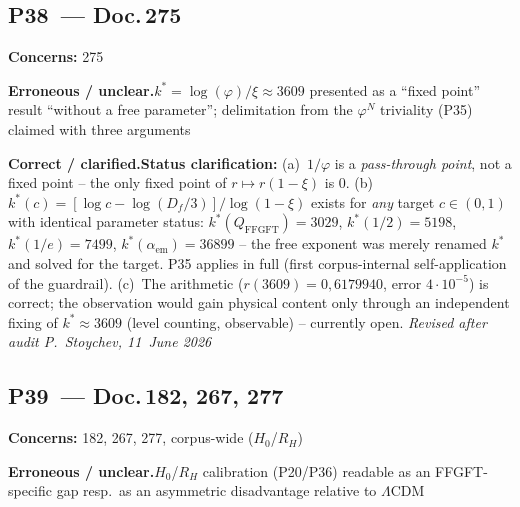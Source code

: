 \medskip


\subsection*{P38~--- Doc.\,275}

\noindent\textbf{Concerns:} 275


\smallskip\noindent\textbf{Erroneous / unclear.}\quad $k^* = \log(\varphi)/\xi \approx 3609$ presented as a \enquote{fixed point} result
  \enquote{without a free parameter}; delimitation from the
  $\varphi^N$ triviality (P35) claimed with three arguments


\smallskip\noindent\textbf{Correct / clarified.}\quad \textbf{Status clarification:} (a)~$1/\varphi$ is a \emph{pass-through point},
  not a fixed point -- the only fixed point of $r\mapsto r(1-\xi)$ is $0$.
  (b)~$k^*(c) = [\log c - \log(D_f/3)]/\log(1-\xi)$ exists for
  \emph{any} target $c\in(0,1)$ with identical parameter status:
  $k^*(Q_\mathrm{FFGFT})=3029$, $k^*(1/2)=5198$, $k^*(1/e)=7499$,
  $k^*(\alpha_\mathrm{em})=36899$ -- the free exponent was merely renamed
  $k^*$ and solved for the target. P35 applies in full
  (first corpus-internal self-application of the guardrail).
  (c)~The arithmetic ($r(3609)=0{,}6179940$, error $4{\cdot}10^{-5}$)
  is correct; the observation would gain physical content only through
  an independent fixing of $k^*\approx3609$ (level counting,
  observable) -- currently open.
  \emph{Revised after audit P.~Stoychev, 11~June 2026}


\medskip


\subsection*{P39~--- Doc.\,182, 267, 277}

\noindent\textbf{Concerns:} 182, 267, 277, corpus-wide ($H_0$/$R_H$)


\smallskip\noindent\textbf{Erroneous / unclear.}\quad $H_0$/$R_H$ calibration (P20/P36) readable as an FFGFT-specific gap resp.\ as an asymmetric disadvantage relative to $\Lambda$CDM


